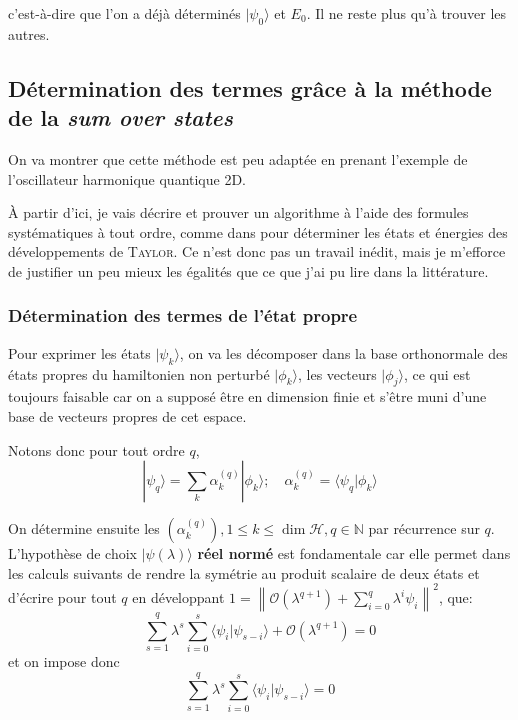 \documentclass[svgnames,dvipsnames,a4paper,10pt,french]{report}
\begin{document}
c'est-à-dire que l'on a déjà déterminés $|\psi_0\rangle$ et $E_0$. Il ne reste plus qu'à trouver les autres. 



\subsection{Détermination des termes grâce à la méthode de la \textit{sum over states}}
\label{title:det_termes_pert}

On va montrer que cette méthode est peu adaptée en prenant l'exemple de l'oscillateur harmonique quantique 2D.

À partir d'ici, je vais décrire et prouver un algorithme à l'aide des formules systématiques à tout ordre, comme dans \cite{cohen-tannoudji_mecanique_2021-1} pour déterminer les états et énergies des développements de \textsc{Taylor}. Ce n'est donc pas un travail inédit, mais je m'efforce de justifier un peu mieux les égalités que ce que j'ai pu lire dans la littérature.





\subsubsection{Détermination des termes de l'état propre}

Pour exprimer les états $|\psi_k\rangle$, on va les décomposer dans la base orthonormale des états propres du hamiltonien non perturbé $|\phi_k\rangle$, les vecteurs $|\phi_j \rangle$, ce qui est toujours faisable car on a supposé être en dimension finie et s'être muni d'une base de vecteurs propres de cet espace. 

Notons donc  pour tout ordre $q$,   
\begin{equation}
    |\psi_q \rangle = \sum_k \alpha_k^{(q)} |\phi_k \rangle; \quad \alpha_k^{(q)} = \langle \psi_q | \phi_k \rangle
\end{equation}

On détermine ensuite les $(\alpha^{(q)}_k), 1\le k \le \dim \mathscr{H}, q\in\mathbb{N}$ par récurrence sur $q$. L'hypothèse de choix $|\psi(\lambda)\rangle$ \textbf{réel normé} est fondamentale car elle permet dans les calculs suivants de rendre la symétrie au produit scalaire de deux états et d'écrire pour tout $q$ en développant $1 = \left\| \mathcal{O}(\lambda^{q+1}) +  \sum_{i=0}^q \lambda^i \psi_i  \right\|^2$, que:
\begin{equation}
    \sum_{s=1}^q \lambda^s \sum_{i=0}^s \langle \psi_i | \psi_{s-i} \rangle + \mathcal{O} ( \lambda^{q+1}) = 0
\end{equation}
et on impose donc
\begin{equation}
\label{astuce_calc}
    \sum_{s=1}^q \lambda^s \sum_{i=0}^s \langle \psi_i | \psi_{s-i} \rangle = 0
\end{equation}
\end{document}
